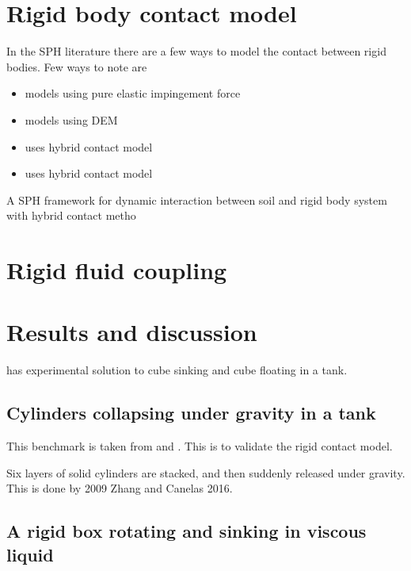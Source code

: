 \documentclass[preprint,12pt]{elsarticle}
\begin{document}
\section{Rigid body contact model}
\label{sec:rbd-contact-model}

In the SPH literature there are a few ways to model the contact
between rigid bodies. Few ways to note are

\begin{itemize}
\item \citet{albano2016modelling} models using pure elastic impingement force
\item \citet{choidevelopment} models using DEM
\item \citet{zhan2020sph} uses hybrid contact model
\item \citet{} uses hybrid contact model
\end{itemize}
A  SPH  framework  for  dynamic interaction  between  soil  and  rigid  body  system  with  hybrid contact   metho


\section{Rigid fluid coupling}
\label{sec:rf-coupling}




\section{Results and discussion}
\label{sec:results}
\citet{wu2014two} has experimental solution to cube sinking and cube floating
in a tank.

\subsection{Cylinders collapsing under gravity in a tank}
\label{sec:cylinders-collapsing-dem}

This benchmark is taken from \citet{chen2019coupled} and
\citet{wang2019numerical}. This is to validate the rigid contact model.

Six layers of solid cylinders are stacked, and then suddenly released under
gravity. This is done by 2009 Zhang and Canelas 2016.


\subsection{A rigid box rotating and sinking in viscous liquid}
\label{sec:rigid-box-rotating-sinking}
\end{document}
